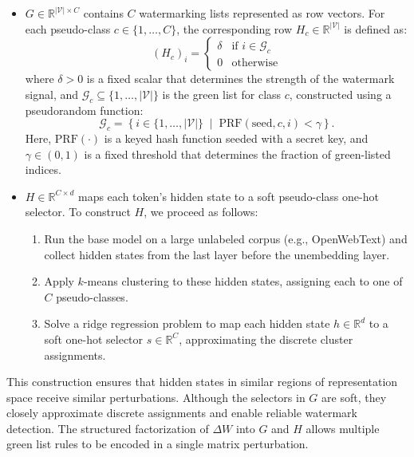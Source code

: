 \begin{itemize}
    \item \( G \in \mathbb{R}^{|\mathcal{V}| \times C} \) contains \( C \) watermarking lists represented as row vectors. For each pseudo-class \( c \in \{1, \dots, C\} \), the corresponding row \( H_c \in \mathbb{R}^{|\mathcal{V}|} \) is defined as:
          \[
              (H_c)_i =
              \begin{cases}
                  \delta & \text{if } i \in \mathcal{G}_c \\
                  0      & \text{otherwise}
              \end{cases}
          \]
          where \( \delta > 0 \) is a fixed scalar that determines the strength of the watermark signal, and \( \mathcal{G}_c \subseteq \{1, \dots, |\mathcal{V}|\} \) is the green list for class \( c \), constructed using a pseudorandom function:
          \[
              \mathcal{G}_c = \left\{ i \in \{1, \dots, |\mathcal{V}|\} \;\middle|\; \mathrm{PRF}(\text{seed}, c, i) < \gamma \right\}.
          \]
          Here, \(\mathrm{PRF}(\cdot)\) is a keyed hash function seeded with a secret key, and \(\gamma \in (0,1)\) is a fixed threshold that determines the fraction of green-listed indices.

    \item \( H \in \mathbb{R}^{C \times d} \) maps each token's hidden state to a soft pseudo-class one-hot selector. To construct \( H \), we proceed as follows:
          \begin{enumerate}
              \item Run the base model on a large unlabeled corpus (e.g., OpenWebText) and collect hidden states from the last layer before the unembedding layer.
              \item Apply \( k \)-means clustering to these hidden states, assigning each to one of \( C \) pseudo-classes.
              \item Solve a ridge regression problem to map each hidden state \( h \in \mathbb{R}^d \) to a soft one-hot selector \( s \in \mathbb{R}^C \), approximating the discrete cluster assignments.
          \end{enumerate}
\end{itemize}

This construction ensures that hidden states in similar regions of representation space receive similar perturbations. Although the selectors in \( G \) are soft, they closely approximate discrete assignments and enable reliable watermark detection. The structured factorization of \( \Delta W \) into \( G \) and \( H \) allows multiple green list rules to be encoded in a single matrix perturbation.

